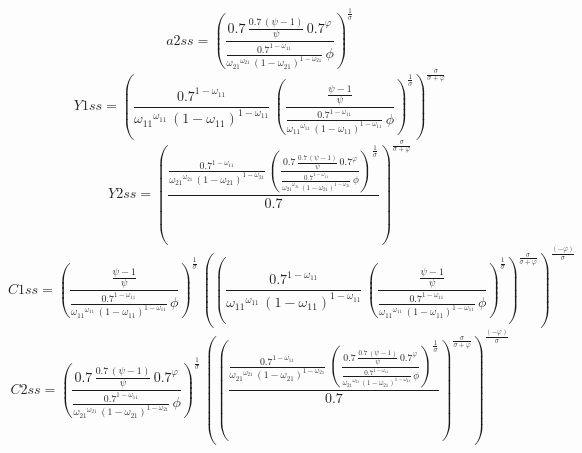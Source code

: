 \begin{dmath*}
a2ss = \left(\frac{0.7\, \frac{0.7\, \left({{\psi}}-1\right)}{{{\psi}}}\, 0.7^{{{\varphi}}}}{\frac{0.7^{1-{{\omega_{11}}}}}{{{\omega_{21}}}^{{{\omega_{21}}}}\, \left(1-{{\omega_{21}}}\right)^{1-{{\omega_{21}}}}}\, {{\phi}}}\right)^{\frac{1}{{{\sigma}}}}
\end{dmath*}
\begin{dmath*}
Y1ss = \left(\frac{0.7^{1-{{\omega_{11}}}}}{{{\omega_{11}}}^{{{\omega_{11}}}}\, \left(1-{{\omega_{11}}}\right)^{1-{{\omega_{11}}}}}\, \left(\frac{\frac{{{\psi}}-1}{{{\psi}}}}{\frac{0.7^{1-{{\omega_{11}}}}}{{{\omega_{11}}}^{{{\omega_{11}}}}\, \left(1-{{\omega_{11}}}\right)^{1-{{\omega_{11}}}}}\, {{\phi}}}\right)^{\frac{1}{{{\sigma}}}}\right)^{\frac{{{\sigma}}}{{{\sigma}}+{{\varphi}}}}
\end{dmath*}
\begin{dmath*}
Y2ss = \left(\frac{\frac{0.7^{1-{{\omega_{11}}}}}{{{\omega_{21}}}^{{{\omega_{21}}}}\, \left(1-{{\omega_{21}}}\right)^{1-{{\omega_{21}}}}}\, \left(\frac{0.7\, \frac{0.7\, \left({{\psi}}-1\right)}{{{\psi}}}\, 0.7^{{{\varphi}}}}{\frac{0.7^{1-{{\omega_{11}}}}}{{{\omega_{21}}}^{{{\omega_{21}}}}\, \left(1-{{\omega_{21}}}\right)^{1-{{\omega_{21}}}}}\, {{\phi}}}\right)^{\frac{1}{{{\sigma}}}}}{0.7}\right)^{\frac{{{\sigma}}}{{{\sigma}}+{{\varphi}}}}
\end{dmath*}
\begin{dmath*}
C1ss = \left(\frac{\frac{{{\psi}}-1}{{{\psi}}}}{\frac{0.7^{1-{{\omega_{11}}}}}{{{\omega_{11}}}^{{{\omega_{11}}}}\, \left(1-{{\omega_{11}}}\right)^{1-{{\omega_{11}}}}}\, {{\phi}}}\right)^{\frac{1}{{{\sigma}}}}\, \left(\left(\frac{0.7^{1-{{\omega_{11}}}}}{{{\omega_{11}}}^{{{\omega_{11}}}}\, \left(1-{{\omega_{11}}}\right)^{1-{{\omega_{11}}}}}\, \left(\frac{\frac{{{\psi}}-1}{{{\psi}}}}{\frac{0.7^{1-{{\omega_{11}}}}}{{{\omega_{11}}}^{{{\omega_{11}}}}\, \left(1-{{\omega_{11}}}\right)^{1-{{\omega_{11}}}}}\, {{\phi}}}\right)^{\frac{1}{{{\sigma}}}}\right)^{\frac{{{\sigma}}}{{{\sigma}}+{{\varphi}}}}\right)^{\frac{\left(-{{\varphi}}\right)}{{{\sigma}}}}
\end{dmath*}
\begin{dmath*}
C2ss = \left(\frac{0.7\, \frac{0.7\, \left({{\psi}}-1\right)}{{{\psi}}}\, 0.7^{{{\varphi}}}}{\frac{0.7^{1-{{\omega_{11}}}}}{{{\omega_{21}}}^{{{\omega_{21}}}}\, \left(1-{{\omega_{21}}}\right)^{1-{{\omega_{21}}}}}\, {{\phi}}}\right)^{\frac{1}{{{\sigma}}}}\, \left(\left(\frac{\frac{0.7^{1-{{\omega_{11}}}}}{{{\omega_{21}}}^{{{\omega_{21}}}}\, \left(1-{{\omega_{21}}}\right)^{1-{{\omega_{21}}}}}\, \left(\frac{0.7\, \frac{0.7\, \left({{\psi}}-1\right)}{{{\psi}}}\, 0.7^{{{\varphi}}}}{\frac{0.7^{1-{{\omega_{11}}}}}{{{\omega_{21}}}^{{{\omega_{21}}}}\, \left(1-{{\omega_{21}}}\right)^{1-{{\omega_{21}}}}}\, {{\phi}}}\right)^{\frac{1}{{{\sigma}}}}}{0.7}\right)^{\frac{{{\sigma}}}{{{\sigma}}+{{\varphi}}}}\right)^{\frac{\left(-{{\varphi}}\right)}{{{\sigma}}}}
\end{dmath*}
